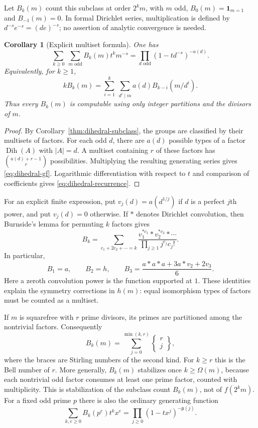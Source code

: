 \documentclass[11pt,a4paper]{amsart}
\newtheorem{corl}[thm]{Corollary}
\theoremstyle{definition}
\theoremstyle{remark}
\numberwithin{equation}{section}
\begin{document}
Let $B_k(m)$ count this subclass at order $2^k m$, with $m$ odd,
$B_0(m)=\mathbf1_{m=1}$ and $B_{-1}(m)=0$. In formal Dirichlet
series, multiplication is defined by $d^{-s}e^{-s}=(de)^{-s}$;
no assertion of analytic convergence is needed.
\begin{corl}[Explicit multiset formula]\label{prop:multiset-formula}
One has
\begin{equation}\label{eq:dihedral-gf}
 \sum_{k\ge0}\ \sum_{m\text{ odd}}B_k(m)t^k m^{-s}
 =\prod_{d\text{ odd}}(1-t d^{-s})^{-a(d)}.
\end{equation}
Equivalently, for $k\ge1$,
\begin{equation}\label{eq:dihedral-recurrence}
 kB_k(m)=\sum_{i=1}^k\ \sum_{d^i\mid m}
                  a(d)B_{k-i}(m/d^i).
\end{equation}
Thus every $B_k(m)$ is computable using only integer partitions and
the divisors of $m$.
\end{corl}
\begin{proof}
By Corollary~\ref{thm:dihedral-subclass}, the groups are classified
by their multisets of factors. For each odd $d$, there are $a(d)$
possible types of a factor
$\operatorname{Dih}(A)$ with $|A|=d$. A multiset containing $r$
of these factors has $\binom{a(d)+r-1}{r}$ possibilities.
Multiplying the resulting generating series gives
\eqref{eq:dihedral-gf}. Logarithmic differentiation with respect to
$t$ and comparison of coefficients gives
\eqref{eq:dihedral-recurrence}.
\end{proof}

For an explicit finite expression, put
$v_j(d)=a(d^{1/j})$ if $d$ is a perfect $j$th power, and put
$v_j(d)=0$ otherwise. If $*$ denotes Dirichlet convolution, then
Burnside's lemma for permuting $k$ factors gives
\[
 B_k=\sum_{c_1+2c_2+\cdots=k}
 \frac{v_1^{*c_1}*v_2^{*c_2}*\cdots}
 {\prod_{j\ge1}j^{c_j}c_j!}.
\]
In particular,
\[
 B_1=a,\qquad B_2=h,\qquad
 B_3=\frac{a*a*a+3a*v_2+2v_3}{6}.
\]
Here a zeroth convolution power is the function supported at $1$.
These identities explain the symmetry corrections in $h(m)$:
equal isomorphism types of factors must be counted as a multiset.

If $m$ is squarefree with $r$ prime divisors, its primes are
partitioned among the nontrivial factors. Consequently
\begin{equation}\label{eq:stirling-count}
 B_k(m)=\sum_{j=0}^{\min(k,r)}
       \left\{\begin{matrix}r\\j\end{matrix}\right\},
\end{equation}
where the braces are Stirling numbers of the second kind.
For $k\ge r$ this is the Bell number of $r$.
More generally, $B_k(m)$ stabilizes once $k\ge\Omega(m)$, because
each nontrivial odd factor consumes at least one prime factor,
counted with multiplicity. This is stabilization of the subclass
count $B_k(m)$, not of $f(2^k m)$.
For a fixed odd prime $p$ there is also the ordinary generating
function
\[
 \sum_{k,e\ge0}B_k(p^e)t^k x^e
       =\prod_{j\ge0}(1-tx^j)^{-\mathsf p(j)}.
\]
\end{document}
